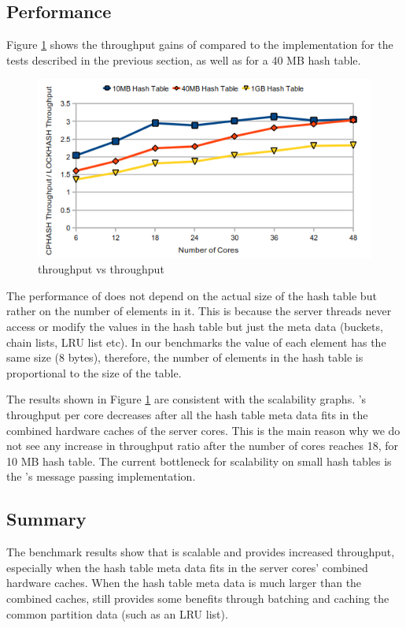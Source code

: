 \subsection{Performance}

Figure \ref{fig:cphashspeedup} shows the throughput gains of \cphash{} compared to the \lockhash{} implementation for the tests described in 
the previous section, as well as for a 40 MB hash table.

\begin{figure}[!ht]
  \centering
  \includegraphics[width=0.8\linewidth]{figs/cphashspeedup.png}
  \caption{\cphash{} throughput vs \lockhash{} throughput}
  \label{fig:cphashspeedup}
\end{figure}

The performance of \cphash{} does not depend on the actual size of the hash table but rather on the number of elements in it. This is because the server 
threads never access or modify the values in the hash table but just the meta data (buckets, chain lists, LRU list etc). In our benchmarks the value of 
each element has the same size (8 bytes), therefore, the number of elements in the hash table is proportional to the size of the table.

The results shown in Figure \ref{fig:cphashspeedup} are consistent with the scalability graphs. \cphash{}'s throughput per core decreases after all 
the hash table meta data fits in the combined hardware caches of the server cores. This is the main reason why we do not see any increase in throughput ratio after 
the number of cores reaches 18, for 10 MB hash table. The current bottleneck for scalability on small hash tables is the \cphash{}'s message passing implementation.

\subsection{Summary}

The benchmark results show that \cphash{} is scalable and provides increased throughput, especially when the hash table meta data fits in the server cores'
combined hardware caches. When the hash table meta data is much larger than the combined caches, \cphash{} still provides some benefits through batching and caching 
the common partition data (such as an LRU list).

